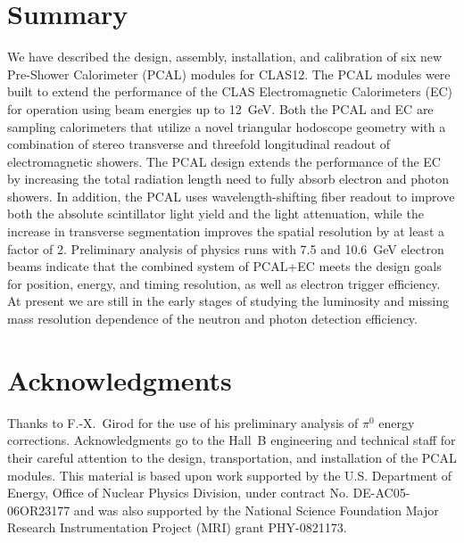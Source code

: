 \section{Summary}

We have described the design, assembly, installation, and calibration of six new Pre-Shower Calorimeter (PCAL)
modules for CLAS12. The PCAL modules were built to extend the performance of the CLAS Electromagnetic
Calorimeters (EC) for operation using beam energies up to 12~GeV. Both the PCAL and EC are sampling calorimeters
that utilize a novel triangular hodoscope geometry with a combination of stereo transverse and threefold longitudinal
readout of electromagnetic showers. The PCAL design extends the performance of the EC by increasing the total
radiation length need to fully absorb electron and photon showers.  In addition, the PCAL uses wavelength-shifting
fiber readout to improve both the absolute scintillator light yield and the light attenuation, while the increase in
transverse segmentation improves the spatial resolution by at least a factor of 2. Preliminary analysis of physics runs
with 7.5 and 10.6~GeV electron beams indicate that the combined system of PCAL+EC meets the design goals for
position, energy, and timing resolution, as well as electron trigger efficiency. At present we are still in the early
stages of studying the luminosity and missing mass resolution dependence of the neutron and photon detection
efficiency.

\section*{Acknowledgments}

Thanks to F.-X.~Girod for the use of his preliminary analysis of $\pi^0$ energy corrections. Acknowledgments go to 
the Hall~B engineering and technical staff for their careful attention to the design, transportation, and installation
of the PCAL modules. This material is based upon work supported by the U.S. Department of Energy, Office of Nuclear
Physics Division, under contract No. DE-AC05-06OR23177 and was also supported by the National Science Foundation
Major Research Instrumentation Project (MRI) grant PHY-0821173.





